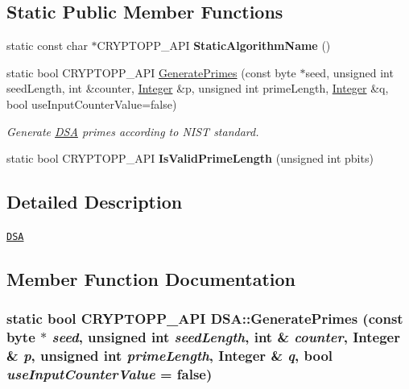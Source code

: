 \subsection*{Static Public Member Functions}
\begin{DoxyCompactItemize}
\item 
\hypertarget{struct_d_s_a_a7a36f5573508e8721214e1d58207c494}{
static const char $\ast$CRYPTOPP\_\-API {\bfseries StaticAlgorithmName} ()}
\label{struct_d_s_a_a7a36f5573508e8721214e1d58207c494}

\item 
static bool CRYPTOPP\_\-API \hyperlink{struct_d_s_a_abd3bcd07ef10d03a0edfc5fb91f43b7c}{GeneratePrimes} (const byte $\ast$seed, unsigned int seedLength, int \&counter, \hyperlink{class_integer}{Integer} \&p, unsigned int primeLength, \hyperlink{class_integer}{Integer} \&q, bool useInputCounterValue=false)
\begin{DoxyCompactList}\small\item\em Generate \hyperlink{struct_d_s_a}{DSA} primes according to NIST standard. \item\end{DoxyCompactList}\item 
\hypertarget{struct_d_s_a_ad8985e695bd76ae5666c797ccc03feda}{
static bool CRYPTOPP\_\-API {\bfseries IsValidPrimeLength} (unsigned int pbits)}
\label{struct_d_s_a_ad8985e695bd76ae5666c797ccc03feda}

\end{DoxyCompactItemize}


\subsection{Detailed Description}
\href{http://www.weidai.com/scan-mirror/sig.html#DSA}{\tt DSA} 

\subsection{Member Function Documentation}
\hypertarget{struct_d_s_a_abd3bcd07ef10d03a0edfc5fb91f43b7c}{
\subsubsection[{GeneratePrimes}]{\setlength{\rightskip}{0pt plus 5cm}static bool CRYPTOPP\_\-API DSA::GeneratePrimes (const byte $\ast$ {\em seed}, \/  unsigned int {\em seedLength}, \/  int \& {\em counter}, \/  {\bf Integer} \& {\em p}, \/  unsigned int {\em primeLength}, \/  {\bf Integer} \& {\em q}, \/  bool {\em useInputCounterValue} = {\ttfamily false})}}
\label{struct_d_s_a_abd3bcd07ef10d03a0edfc5fb91f43b7c}



